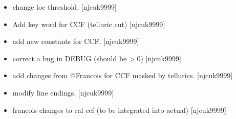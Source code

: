 \documentclass[a4paper,10pt,english]{report}
\begin{document}
\begin{itemize}
\item {} 
 \sphinxhyphen{} change loc threshold. {[}njcuk9999{]}

\item {} 
 \sphinxhyphen{} Add key word for CCF (telluric cut) {[}njcuk9999{]}

\item {} 
 \sphinxhyphen{} add new constants for CCF. {[}njcuk9999{]}

\item {} 
 \sphinxhyphen{} correct a bug in DEBUG (should be \textgreater{} 0)
{[}njcuk9999{]}

\item {} 
 \sphinxhyphen{} add changes from @Francois for CCF masked
by tellurics. {[}njcuk9999{]}

\item {} 
 \sphinxhyphen{} modify line endings. {[}njcuk9999{]}

\item {} 
 \sphinxhyphen{} francois changes to cal ccf (to be
integrated into  actual) {[}njcuk9999{]}

\end{itemize}
\end{document}
